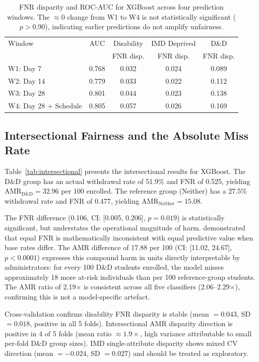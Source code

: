 \documentclass[12pt,a4paper]{article}
\begin{document}
\begin{table}[ht]
\centering
\caption{FNR disparity and ROC-AUC for XGBoost across four prediction
windows. The $\approx 0$ change from W1 to W4 is not statistically significant
($p > 0.90$), indicating earlier predictions do not amplify unfairness.}
\label{tab:temporal}
\small
\begin{tabular}{lcccc}
\toprule
Window & AUC & Disability & IMD Deprived & D\&D \\
       &     & FNR disp.  & FNR disp.    & FNR disp. \\
\midrule
W1: Day 7            & 0.768 & 0.032 & 0.024 & 0.089 \\
W2: Day 14           & 0.779 & 0.033 & 0.022 & 0.112 \\
W3: Day 28           & 0.801 & 0.044 & 0.023 & 0.138 \\
W4: Day 28 + Schedule& 0.805 & 0.057 & 0.026 & 0.169 \\
\bottomrule
\end{tabular}
\end{table}

\subsection{Intersectional Fairness and the Absolute Miss Rate}

Table~\ref{tab:intersectional} presents the intersectional results for
XGBoost. The D\&D group has an actual withdrawal rate of 51.9\% and FNR of
0.525, yielding AMR$_{\text{D\&D}} = 32.96$ per 100 enrolled. The reference
group (Neither) has a 27.5\% withdrawal rate and FNR of 0.477, yielding
AMR$_{\text{Neither}} = 15.08$.

The FNR difference (0.106, CI: [0.005, 0.206], $p = 0.019$) is statistically
significant, but understates the operational magnitude of harm.
\citet{chouldechova2017} demonstrated that equal FNR is mathematically
inconsistent with equal predictive value when base rates differ. The AMR
difference of 17.88 per 100 (CI: [11.02, 24.67], $p < 0.0001$) expresses
this compound harm in units directly interpretable by administrators: for
every 100 D\&D students enrolled, the model misses approximately 18 more
at-risk individuals than per 100 reference-group students. The AMR ratio of
2.19$\times$ is consistent across all five classifiers (2.06--2.29$\times$),
confirming this is not a model-specific artefact.

Cross-validation confirms disability FNR disparity is stable (mean $= 0.043$,
SD $= 0.018$, positive in all 5 folds). Intersectional AMR disparity direction
is positive in 4 of 5 folds (mean ratio $\approx 1.9\times$, high variance
attributable to small per-fold D\&D group sizes). IMD single-attribute
disparity shows mixed CV direction (mean $= -0.024$, SD $= 0.027$) and should
be treated as exploratory.
\end{document}
